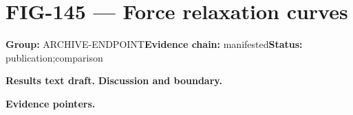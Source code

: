 \clearpage
\section{FIG-145 --- Force relaxation curves}
\label{figpage:fig-145}
\textbf{Group:} ARCHIVE-ENDPOINT\quad \textbf{Evidence chain:} manifested\quad \textbf{Status:} publication;comparison

\textbf{Results text draft.} 
\textbf{Discussion and boundary.} 


\textbf{Evidence pointers.}



\vfill
